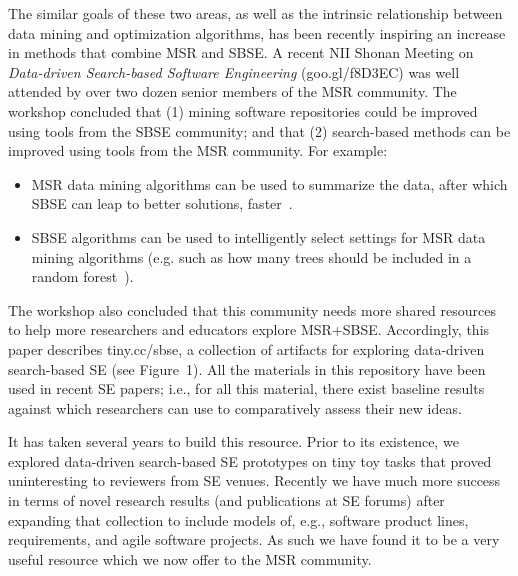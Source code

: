 \documentclass[sigconf,anonymous,review]{acmart}
\newcommand\TODO[1]{\textcolor{ScarletRed}{\textbf{\colorbox{yellow}{\small TODO:}} \emph{#1}}\xspace}
\begin{document}
{The similar goals of these two areas, as well as the intrinsic relationship between data mining and optimization algorithms, has been recently inspiring an} increase in methods that combine MSR and SBSE.
A recent {NII Shonan Meeting}  on {\em Data-driven Search-based Software
Engineering} (goo.gl/f8D3EC)   was well attended by over two dozen senior members of the MSR community.
The workshop concluded that (1) mining software repositories could be improved using {tools from the SBSE community}; and that (2) search-based methods can be improved using tools from the MSR community. 
For example:
\begin{itemize}[leftmargin=*]
\item
MSR data mining algorithms can be used to summarize the data, after which SBSE can leap to better solutions, faster~\cite{krall2015gale}.
\item
SBSE {algorithms} can be used to intelligently select 
settings for MSR data mining algorithms (e.g.
such as how many trees should be included in a random
forest~\cite{fu2016tuning}).
\end{itemize}
The workshop also concluded that this community needs more shared  resources 
to help more researchers and educators explore MSR+SBSE.
Accordingly, this paper describes  tiny.cc/sbse,
a collection of artifacts for exploring
data-driven search-based SE (see Figure~1). 
All the materials in this repository
have been used in recent SE papers; i.e., for all this material, there exist baseline results against which researchers can use to comparatively assess their new ideas.

It has taken several years to build this resource. Prior to its
existence, we explored data-driven search-based SE
prototypes on tiny toy tasks that proved 
uninteresting to 
 reviewers from SE venues. 
Recently we have much more success in terms of novel
research results
(and publications at SE forums) after 
expanding that collection
to include models
of, e.g., software product lines, requirements, and
agile software projects. 
As such we have found it to be a very useful resource
which we now offer to the MSR community.






\end{document}
